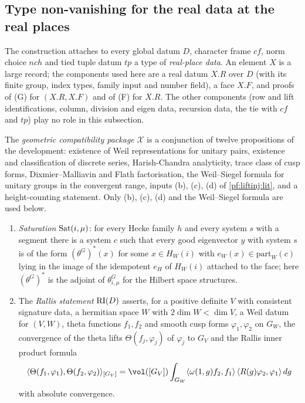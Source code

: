 \subsection{Type non-vanishing for the real data at the real places}\label{sec:pf:liftinj:B}

The construction attaches to every global datum $D$, character frame $\mathit{cf}$, norm choice $\mathit{nch}$ and tied tuple datum $\mathit{tp}$ a
type of \emph{real-place data}. An element $X$ is a large record; the components used here are a real datum $X.R$ over $D$ (with its finite group,
index types, family input and number field), a face $X.F$, and proofs of (G) for $(X.R,X.F)$ and of (F) for $X.R$. The other components (row and
lift identifications, column, division and eigen data, recursion data, the tie with $\mathit{cf}$ and $\mathit{tp}$) play no role in this subsection.

The \emph{geometric compatibility package} $\mathcal X$ is a conjunction of twelve propositions of the development: existence of Weil
representations for unitary pairs, existence and classification of discrete series, Harish-Chandra analyticity, trace class of cusp forms,
Dixmier--Malliavin and Flath factorisation, the Weil--Siegel formula for unitary groups in the convergent range, inputs (b), (c), (d) of
\cref{pf:liftinj:lit}, and a height-counting statement. Only (b), (c), (d) and the Weil--Siegel formula are used below.

\begin{definition}\label{pf:liftinj:satdef}
\begin{enumerate}[label=(\alph*)]
\item \emph{Saturation} $\mathrm{Sat}(i,\mu)$: for every Hecke family $h$ and every system $s$ with a segment there is a system $c$ such that every good
eigenvector $y$ with system $s$ is of the form $(\theta^G)^*(x)$ for some $x\in H_W(i)$ with $e_W(x)\in\mathrm{part}_W(c)$ lying in the image of the
idempotent $e_H$ of $H_W(i)$ attached to the face; here $(\theta^G)^*$ is the adjoint of $\theta^G_{i,\mu}$ for the Hilbert space structures.
\item The \emph{Rallis statement} $\mathrm{RI}(D)$ asserts, for a positive definite $V$ with consistent signature data, a hermitian space $W$ with
$2\dim W<\dim V$, a Weil datum for $(V,W)$, theta functions $f_1,f_2$ and smooth cusp forms $\varphi_1,\varphi_2$ on $G_W$, the convergence of the
theta lifts $\Theta(f_j,\varphi_j)$ of $\varphi_j$ to $G_V$ and the Rallis inner product formula
\[
\langle\Theta(f_1,\varphi_1),\Theta(f_2,\varphi_2)\rangle_{[G_V]}=\vol([G_V])\int_{G_W}\langle\omega(1,g)f_2,f_1\rangle\,\langle R(g)\varphi_2,\varphi_1\rangle\,dg
\]
with absolute convergence.
\end{enumerate}
\end{definition}

